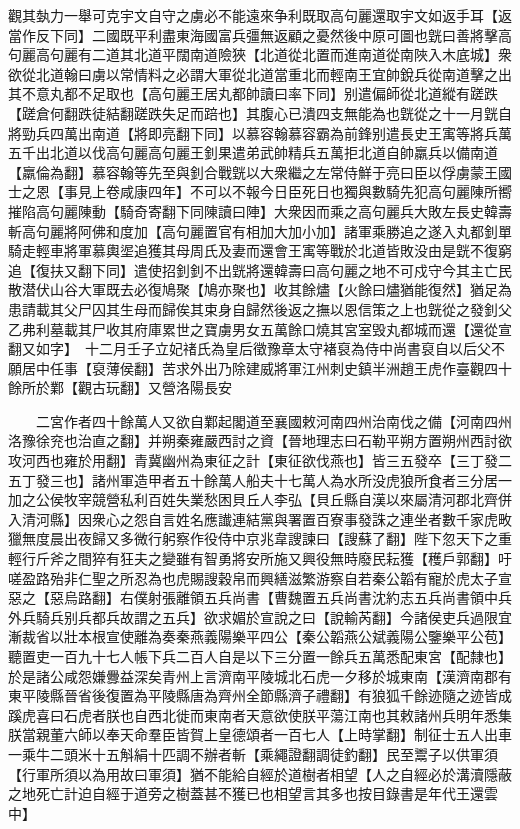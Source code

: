 觀其埶力一舉可克宇文自守之虜必不能遠來争利既取高句麗還取宇文如返手耳【返當作反下同】二國既平利盡東海國富兵彊無返顧之憂然後中原可圖也皝曰善將擊高句麗高句麗有二道其北道平闊南道險狹【北道從北置而進南道從南陜入木底城】衆欲從北道翰曰虜以常情料之必謂大軍從北道當重北而輕南王宜帥銳兵從南道擊之出其不意丸都不足取也【高句麗王居丸都帥讀曰率下同】别遣偏師從北道縱有蹉跌【蹉倉何翻跌徒結翻蹉跌失足而踣也】其腹心已潰四支無能為也皝從之十一月皝自將勁兵四萬出南道【將即亮翻下同】以慕容翰慕容霸為前鋒别遣長史王㝢等將兵萬五千出北道以伐高句麗高句麗王釗果遣弟武帥精兵五萬拒北道自帥羸兵以備南道【羸倫為翻】慕容翰等先至與釗合戰皝以大衆繼之左常侍鮮于亮曰臣以俘虜蒙王國士之恩【事見上卷咸康四年】不可以不報今日臣死日也獨與數騎先犯高句麗陳所嚮摧陷高句麗陳動【騎奇寄翻下同陳讀曰陣】大衆因而乘之高句麗兵大敗左長史韓壽斬高句麗將阿佛和度加【高句麗置官有相加大加小加】諸軍乘勝追之遂入丸都釗單騎走輕車將軍慕輿埿追獲其母周氏及妻而還會王㝢等戰於北道皆敗没由是皝不復窮追【復扶又翻下同】遣使招釗釗不出皝將還韓壽曰高句麗之地不可戍守今其主亡民散潜伏山谷大軍既去必復鳩聚【鳩亦聚也】收其餘燼【火餘曰燼猶能復然】猶足為患請載其父尸囚其生母而歸俟其束身自歸然後返之撫以恩信策之上也皝從之發釗父乙弗利墓載其尸收其府庫累世之寶虜男女五萬餘口燒其宮室毁丸都城而還【還從宣翻又如字】　十二月壬子立妃禇氏為皇后徵豫章太守褚裒為侍中尚書裒自以后父不願居中任事【裒薄侯翻】苦求外出乃除建威將軍江州刺史鎮半洲趙王虎作臺觀四十餘所於鄴【觀古玩翻】又營洛陽長安

　　二宮作者四十餘萬人又欲自鄴起閣道至襄國敕河南四州治南伐之備【河南四州洛豫徐兖也治直之翻】并朔秦雍嚴西討之資【晉地理志曰石勒平朔方置朔州西討欲攻河西也雍於用翻】青冀幽州為東征之計【東征欲伐燕也】皆三五發卒【三丁發二五丁發三也】諸州軍造甲者五十餘萬人船夫十七萬人為水所没虎狼所食者三分居一加之公侯牧宰競營私利百姓失業愁困貝丘人李弘【貝丘縣自漢以來屬清河郡北齊併入清河縣】因衆心之怨自言姓名應䜟連結黨與署置百寮事發誅之連坐者數千家虎畋獵無度晨出夜歸又多微行躬察作役侍中京兆韋謏諫曰【謏蘇了翻】陛下忽天下之重輕行斤斧之間猝有狂夫之變雖有智勇將安所施又興役無時廢民耘獲【穫戶郭翻】吁嗟盈路殆非仁聖之所忍為也虎賜謏穀帛而興繕滋繁游察自若秦公韜有寵於虎太子宣惡之【惡烏路翻】右僕射張離領五兵尚書【曹魏置五兵尚書沈約志五兵尚書領中兵外兵騎兵别兵都兵故謂之五兵】欲求媚於宣說之曰【說輸芮翻】今諸侯吏兵過限宜漸裁省以壯本根宣使離為奏秦燕義陽樂平四公【秦公韜燕公斌義陽公鑒樂平公苞】聽置吏一百九十七人帳下兵二百人自是以下三分置一餘兵五萬悉配東宮【配隸也】於是諸公咸怨嫌釁益深矣青州上言濟南平陵城北石虎一夕移於城東南【漢濟南郡有東平陵縣晉省後復置為平陵縣唐為齊州全節縣濟子禮翻】有狼狐千餘迹隨之迹皆成蹊虎喜曰石虎者朕也自西北徙而東南者天意欲使朕平蕩江南也其敕諸州兵明年悉集朕當親董六師以奉天命羣臣皆賀上皇德頌者一百七人【上時掌翻】制征士五人出車一乘牛二頭米十五斛絹十匹調不辦者斬【乘繩證翻調徒釣翻】民至鬻子以供軍須【行軍所須以為用故曰軍須】猶不能給自經於道樹者相望【人之自經必於溝瀆隱蔽之地死亡計迫自經于道旁之樹蓋甚不獲已也相望言其多也按目錄書是年代王還雲中】

